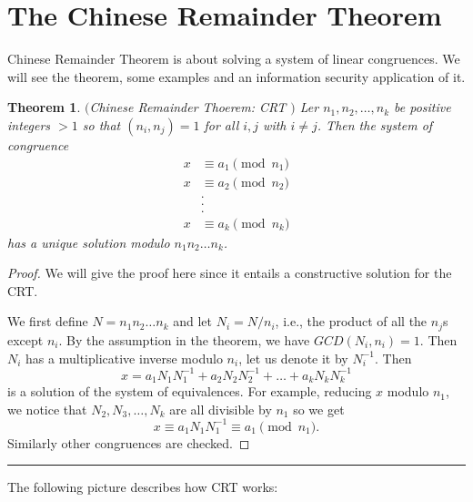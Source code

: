 \documentclass[12pt]{article}
\theoremstyle{plain}
\newtheorem{theorem}{Theorem}
\theoremstyle{definition}
\theoremstyle{remark}
\begin{document}
\section{The Chinese Remainder Theorem}
Chinese Remainder Theorem is about solving a system of linear congruences. We will see the theorem, some examples and an information security application of it. 
\begin{theorem} $($Chinese Remainder Thoerem: CRT $)$ \label{CRT} Ler $n_1, n_2, \dots, n_k$ be positive integers $>1$ so that $(n_i,n_j)=1$ for all $i, j$ with $i\neq j$. Then the system of congruence 
\begin{align*}
    x &\equiv a_1 \pmod{n_1} \\
    x &\equiv a_2 \pmod{n_2} \\
    &.\\
    &.\\
    &.\\
    x &\equiv a_k \pmod{n_k} 
\end{align*}
has a unique solution modulo $n_1n_2\dots n_k$.
\end{theorem}
\begin{proof}
We will give the proof here since it entails a constructive solution for the CRT. 

We first define $N=n_1n_2\dots n_k$ and let $N_i=N/n_i$, i.e., the product of all the $n_j$s except $n_i$. By the assumption in the theorem, we have $GCD(N_i, n_i)=1$. Then $N_i$ has a multiplicative inverse modulo $n_i$, let us denote it by $N_i^{-1}$. Then 
$$x=a_1N_1N_1^{-1}+a_2N_2N_2^{-1}+\dots +a_kN_kN_k^{-1}$$
is a solution of the system of equivalences. For example, reducing $x$ modulo $n_1$, we notice that $N_2, N_3, \dots, N_k$ are all divisible by $n_1$ so we get 
$$x\equiv a_1N_1N_1^{-1} \equiv a_1 \pmod{n_1}. $$ Similarly other congruences are checked. 
\end{proof}
\hrule
\medskip

The following picture describes how CRT works:

\bigskip
\end{document}
